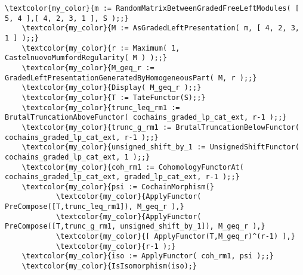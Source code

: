 \documentclass[16pt,a4paper]{extarticle}
\theoremstyle{definition}
\theoremstyle{theorem}
\begin{document}
\begin{Verbatim}[commandchars=\\\{\}, fontseries=b, frame=single, label=Gap Code, framerule=0.5mm, rulecolor=\color{rule_color} ]
    \textcolor{my_color}{m := RandomMatrixBetweenGradedFreeLeftModules( [ 5, 4 ],[ 4, 2, 3, 1 ], S );;}
    \textcolor{my_color}{M := AsGradedLeftPresentation( m, [ 4, 2, 3, 1 ] );;}
    \textcolor{my_color}{r := Maximum( 1, CastelnuovoMumfordRegularity( M ) );;}
    \textcolor{my_color}{M_geq_r := GradedLeftPresentationGeneratedByHomogeneousPart( M, r );;}
    \textcolor{my_color}{Display( M_geq_r );;}
    \textcolor{my_color}{T := TateFunctor(S);;}
    \textcolor{my_color}{trunc_leq_rm1 := BrutalTruncationAboveFunctor( cochains_graded_lp_cat_ext, r-1 );;}
    \textcolor{my_color}{trunc_g_rm1 := BrutalTruncationBelowFunctor( cochains_graded_lp_cat_ext, r-1 );;}
    \textcolor{my_color}{unsigned_shift_by_1 := UnsignedShiftFunctor( cochains_graded_lp_cat_ext, 1 );;}
    \textcolor{my_color}{coh_rm1 := CohomologyFunctorAt( cochains_graded_lp_cat_ext, graded_lp_cat_ext, r-1 );;}
    \textcolor{my_color}{psi := CochainMorphism(}
            \textcolor{my_color}{ApplyFunctor( PreCompose([T,trunc_leq_rm1]), M_geq_r ),}
            \textcolor{my_color}{ApplyFunctor( PreCompose([T,trunc_g_rm1, unsigned_shift_by_1]), M_geq_r ),}
            \textcolor{my_color}{[ ApplyFunctor(T,M_geq_r)^(r-1) ],}
            \textcolor{my_color}{r-1 );}
    \textcolor{my_color}{iso := ApplyFunctor( coh_rm1, psi );;}
    \textcolor{my_color}{IsIsomorphism(iso);}
\end{Verbatim}
\end{document}
